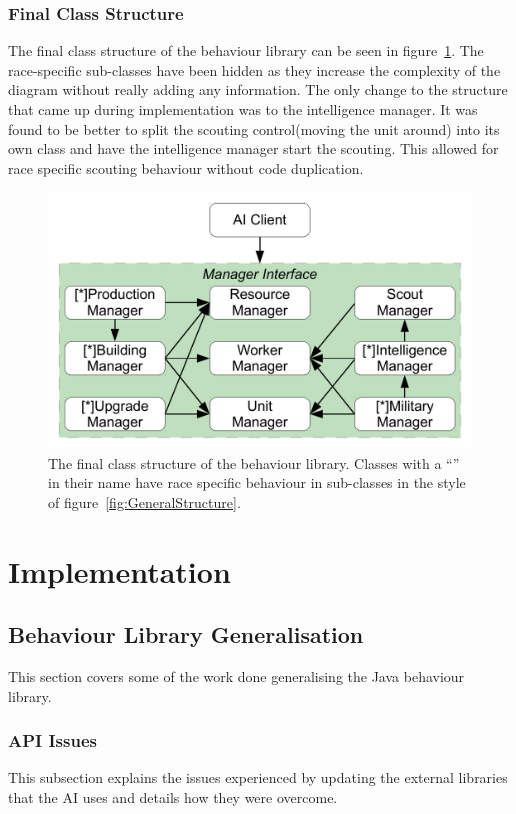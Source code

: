 \documentclass[11pt,openright,a4paper]{report}
\begin{document}
\subsection{Final Class Structure}
The final class structure of the behaviour library can be seen in figure~\ref{fig:ClassDia}. The race-specific sub-classes have been hidden as they increase the complexity of the diagram without really adding any information. The only change to the structure that came up during implementation was to the intelligence manager. It was found to be better to split the scouting control(moving the unit around) into its own class and have the intelligence manager start the scouting. This allowed for race specific scouting behaviour without code duplication.
\begin{figure}[h]
    \centering
    \includegraphics[scale=0.5]{ClassDia}
    \caption{The final class structure of the behaviour library. Classes with a ``\lbrack*\rbrack'' in their name have race specific behaviour in sub-classes in the style of figure~\ref{fig:GeneralStructure}.}
    \label{fig:ClassDia}
\end{figure}

\chapter{Implementation}
\label{Implementation}

\section{Behaviour Library Generalisation}
This section covers some of the work done generalising the Java behaviour library.
\subsection{API Issues}
\label{APIIssue}
This subsection explains the issues experienced by updating the external libraries that the AI uses and details how they were overcome.
\end{document}
